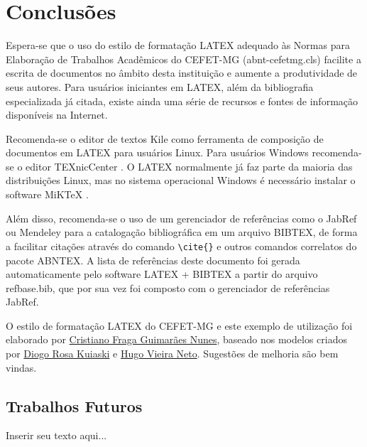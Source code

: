 %
%

\chapter{Conclusões}
\label{chap:conclusoes}

Espera-se que o uso do estilo de formatação LATEX adequado às Normas para Elaboração de Trabalhos Acadêmicos do CEFET-MG ({\ttfamily abnt-cefetmg.cls}) facilite a escrita de documentos no âmbito desta instituição e aumente a produtividade de seus autores. Para usuários iniciantes em LATEX, além da bibliografia especializada já citada, existe ainda uma série de recursos \cite{CTAN2009} e fontes de informação \cite{TeX-Br2009,Wikibooks2009} disponíveis na Internet.

Recomenda-se o editor de textos Kile como ferramenta de composição de documentos em LATEX para usuários Linux. Para usuários Windows recomenda-se o editor TEXnicCenter \cite{TeXnicCenter2009}. O LATEX normalmente já faz parte da maioria das distribuições Linux, mas no sistema operacional Windows é necessário instalar o software MiKTeX \cite{MiKTeX2009}.

Além disso, recomenda-se o uso de um gerenciador de referências como o JabRef \cite{JabRef2009} ou Mendeley \cite{Mendeley2009} para a catalogação bibliográfica em um arquivo BIBTEX, de forma a facilitar citações através do comando \verb#\cite{}# e outros comandos correlatos do pacote ABNTEX. A lista de referências deste documento foi gerada automaticamente pelo software LATEX + BIBTEX a partir do arquivo {\ttfamily refbase.bib}, que por sua vez foi composto com o gerenciador de referências JabRef.

O estilo de formatação LATEX do CEFET-MG e este exemplo de utilização foi elaborado por
\href{mailto:cfgnunes@gmail.com}{Cristiano Fraga Guimarães Nunes},
baseado nos modelos criados por
\href{mdiogo.kuiaski@gmail.com}{Diogo Rosa Kuiaski} e \href{hvieir@utfpr.edu.br}{Hugo Vieira Neto}. Sugestões de melhoria são bem vindas.

\section{Trabalhos Futuros}
\label{sec:trabalhosFuturos}

Inserir seu texto aqui...
